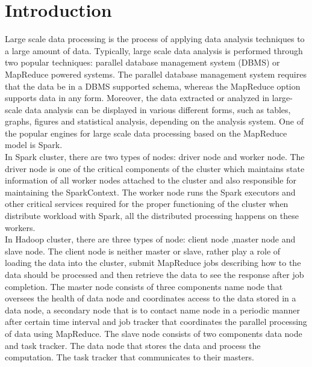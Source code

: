 \documentclass[conference]{IEEEtran}
\begin{document}
\section{Introduction}
Large scale data processing is the process of applying data analysis techniques to a large amount of data. Typically, large scale data analysis is performed through two popular techniques: parallel database management system (DBMS) or MapReduce powered systems. The parallel database management system requires that the data be in a DBMS supported schema, whereas the MapReduce option supports data in any form. Moreover, the data extracted or analyzed in large-scale data analysis can be displayed in various different forms, such as tables, graphs, figures and statistical analysis, depending on the analysis system. One of the popular engines for large scale data processing based on the MapReduce model is Spark.\\
\indent In Spark cluster, there are two types of nodes: driver node and worker node. The driver node is one of the critical components of the cluster which maintains state information of all worker nodes attached to the cluster and also responsible for maintaining the SparkContext. The worker node runs the Spark executors and other critical services required for the proper functioning of the cluster when distribute workload with Spark, all the distributed processing happens on these workers.\\
\indent In Hadoop cluster, there are three types of node: client node ,master node and slave node. The client node is neither master or slave, rather play a role of loading the data into the cluster, submit MapReduce jobs describing how to the data should be processed and then retrieve the data to see the response after job completion. The master node consists of three components name node that oversees the health of data node and coordinates access to the data stored in a data node, a secondary node that is to contact name node in a periodic manner after certain time interval and job tracker that coordinates the parallel processing of data using MapReduce. The slave node consists of two components data node and task tracker. The data node that stores the data and process the computation. The task tracker that communicates to their masters.

\end{document}
